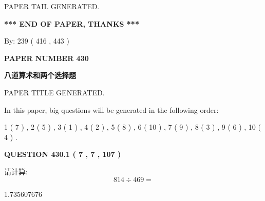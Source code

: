 \documentclass{ctexart}
\begin{document}
   
   
\vspace{2.0in} PAPER TAIL GENERATED.
   
   
   
   
\vspace{1.0in} 
{\textbf{\large{ *** END OF PAPER, THANKS *** }}} 
   
   
\hspace{1.0in} By: 
 239 ( 416 ,  443 )
   
   
   
   
\newpage 
\setcounter{page}{ 
   430001 } 
   
   
   
   
 {\textbf{ \Large{ PAPER NUMBER  430  }}}
   
   
\vspace{0.2in}
   
   
   
   
   
   
   
   
 \vspace{0.2in}
{\LARGE {\textbf{ 八道算术和两个选择题}}}
   
   
 PAPER TITLE GENERATED.
   
   
   
\vspace{0.2in}
   
In this paper, big questions will be generated in the following order: 
   
   
   1 ( 7 )
 ,
   2 ( 5 )
 ,
   3 ( 1 )
 ,
   4 ( 2 )
 ,
   5 ( 8 )
 ,
   6 ( 10 )
 ,
   7 ( 9 )
 ,
   8 ( 3 )
 ,
   9 ( 6 )
 ,
   10 ( 4 )
 .
  
\vspace{0.2in}
  
{\textbf{\Large{QUESTION
430.1 
 ( 7 , 7 , 107 )
}}}
  
  
 
请计算:
\begin{equation}
814  \div    %
469 = \nonumber
\end{equation}
 
 
 
\noindent{}
 
 

1.735607676
 
 
\noindent{}
 
\end{document}
